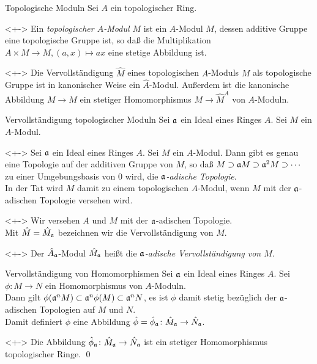 \begin{frame}{Topologische Moduln}
	Sei \(A\) ein topologischer Ring. 
	\begin{definition}<+->
		Ein \emph{topologischer \(A\)-Modul \(M\)} ist ein \(A\)-Modul \(M\), dessen
		additive Gruppe eine topologische Gruppe ist, so daß die Multiplikation \(A \times M \to M, (a, x) \mapsto a x\)
		eine stetige Abbildung ist.
	\end{definition}
	\begin{remark}<+->
		Die Vervollständigung \(\hat M\) eines topologischen \(A\)-Moduls \(M\) als topologische Gruppe ist in kanonischer Weise
		ein \(\hat A\)-Modul. Außerdem ist die kanonische Abbildung \(M \to \hat M\) ein stetiger Homomorphismus
		\(M \to \hat M^{A}\) von \(A\)-Moduln.
	\end{remark}
\end{frame}

\begin{frame}{Vervollständigung topologischer Moduln}
	Sei \(\mathfrak{a}\) ein Ideal eines Ringes \(A\). Sei \(M\) ein \(A\)-Modul. 
	\begin{example}<+->
		Sei \(\mathfrak{a}\) ein Ideal eines Ringes \(A\). Sei \(M\) ein \(A\)-Modul. Dann gibt es genau eine Topologie
		auf der additiven Gruppe von \(M\), so daß \(M \supset \mathfrak{a} M \supset \mathfrak{a}^2 M \supset \dotsb\) zu einer
		Umgebungsbasis von \(0\) wird, die \emph{\(\mathfrak{a}\)-adische Topologie}.
		\\
		In der Tat wird \(M\) damit zu einem topologischen \(A\)-Modul, wenn \(M\) mit der \(\mathfrak{a}\)-adischen Topologie
		versehen wird.
	\end{example}
	\begin{visibleenv}<+->
		Wir versehen \(A\) und \(M\) mit der
		\(\mathfrak{a}\)-adischen Topologie.
		\\
		Mit \(\hat M = \hat M_{\mathfrak{a}}\) bezeichnen wir die Vervollständigung von \(M\).
	\end{visibleenv}
	\begin{definition}<+->
		Der \(\hat A_{\mathfrak{a}}\)-Modul \(\hat M_{\mathfrak{a}}\) heißt die \emph{\(\mathfrak{a}\)-adische Vervollständigung von \(M\)}.
	\end{definition}
\end{frame}

\begin{frame}{Vervollständigung von Homomorphismen}
	Sei \(\mathfrak{a}\) ein Ideal eines Ringes \(A\). Sei \(\phi\colon M \to N\) ein Homomorphismus von \(A\)-Moduln.
	\\
	Dann gilt \(\phi(\mathfrak{a}^n M) \subset \mathfrak{a}^n \phi(M) \subset \mathfrak{a}^n N\), es ist
	\(\phi\) damit stetig bezüglich der \(\mathfrak{a}\)-adischen Topologien auf \(M\) und \(N\).
	\\
	Damit definiert \(\phi\) eine Abbildung \(\hat\phi = \hat\phi_{\mathfrak{a}}\colon \hat M_{\mathfrak{a}} \to \hat N_{\mathfrak{a}}\).
	\begin{proposition}<+->
		Die Abbildung \(\hat\phi_{\mathfrak{a}}\colon \hat M_{\mathfrak{a}} \to \hat N_{\mathfrak{a}}\) ist ein stetiger
		Homomorphismus topologischer Ringe.
		\qed
	\end{proposition}
\end{frame}

